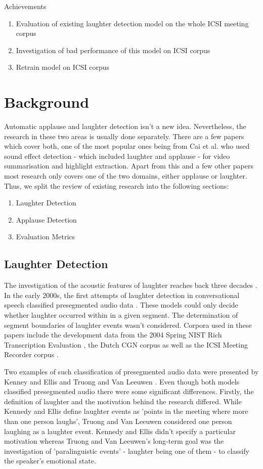 \documentclass[bsc,frontabs,parskip,deptreport]{infthesis}
\begin{document}
Achievements
\begin{enumerate}
  \item Evaluation of existing laughter detection model on the whole ICSI meeting corpus
  \item Investigation of bad performance of this model on ICSI corpus
  \item Retrain model on ICSI corpus
\end{enumerate}

\chapter{Background} \label{cha:bg}
Automatic applause and laughter detection isn't a new idea. Nevertheless, the research in these two areas is usually done separately. There are a few papers which cover both, one of the most popular ones being from Cai et al. \citep{cai2003highlight} who used sound effect detection - which included laughter and applause - for video summarisation and highlight extraction.
Apart from this and a few other papers most research only covers one of the two domains, either applause or laughter. Thus, we split the review of existing research into the following sections:
\begin{enumerate}
  \item Laughter Detection
  \item Applause Detection
  \item Evaluation Metrics 
\end{enumerate}


\section{Laughter Detection} \label{sec:bg-laughter}
The investigation of the acoustic features of laughter reaches back three decades \citep{bickley1992acoustic}.
In the early 2000s, the first attempts of laughter detection in conversational speech classified presegmented audio data \citep{kennedy2004laughter, truong2005automatic}. These models could only decide whether laughter occurred within in a given segment. The determination of segment boundaries of laughter events wasn't considered. 
Corpora used in these papers include the development data from the 2004 Spring NIST Rich Transcription Evaluation \citep{ldcnistcorpus}, the Dutch CGN corpus \citep{oostdijk2000spoken} as well as the ICSI Meeting Recorder corpus \citep{morgan2001meeting}. 

Two examples of such classification of presegmented audio data were presented by Kenney and Ellis \citep{kennedy2004laughter} and Truong and Van Leeuwen \citep{truong2005automatic}. 
Even though both models classified presegmented audio there were some significant differences. 
Firstly, the definition of laughter and the motivation behind the research differed.
While Kennedy and Ellis define laughter events as 'points in the meeting where more than one person laughs', Truong and Van Leeuwen considered one person laughing as a laughter event.
Kennedy and Ellis didn't specify a particular motivation whereas Truong and Van Leeuwen's long-term goal was the investigation of 'paralinguistic events' - laughter being one of them - to classify the speaker's emotional state.   
\end{document}
